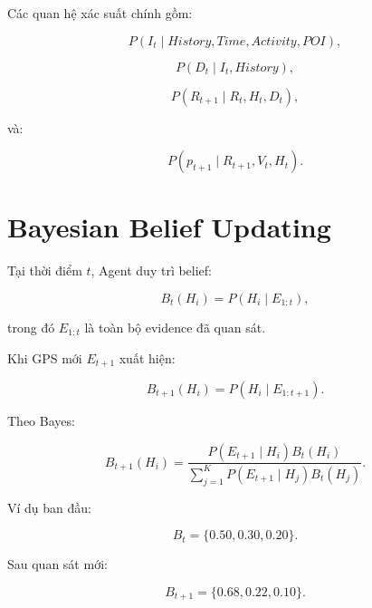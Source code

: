 \documentclass[11pt,a4paper]{article}
\begin{document}
	Các quan hệ xác suất chính gồm:
	
	\begin{equation}
		P(I_t\mid History,Time,Activity,POI),
	\end{equation}
	
	\begin{equation}
		P(D_t\mid I_t,History),
	\end{equation}
	
	\begin{equation}
		P(R_{t+1}\mid R_t,H_t,D_t),
	\end{equation}
	
	và:
	
	\begin{equation}
		P(p_{t+1}\mid R_{t+1},V_t,H_t).
	\end{equation}
	
	\section{Bayesian Belief Updating}
	
	Tại thời điểm $t$, Agent duy trì belief:
	
	\begin{equation}
		B_t(H_i)
		=
		P(H_i\mid E_{1:t}),
	\end{equation}
	
	trong đó $E_{1:t}$ là toàn bộ evidence đã quan sát.
	
	Khi GPS mới $E_{t+1}$ xuất hiện:
	
	\begin{equation}
		B_{t+1}(H_i)
		=
		P(H_i\mid E_{1:t+1}).
	\end{equation}
	
	Theo Bayes:
	
	\begin{equation}
		B_{t+1}(H_i)
		=
		\frac{
			P(E_{t+1}\mid H_i)
			B_t(H_i)
		}{
			\sum_{j=1}^{K}
			P(E_{t+1}\mid H_j)
			B_t(H_j)
		}.
	\end{equation}
	
	Ví dụ ban đầu:
	
	\begin{equation}
		B_t
		=
		\{
		0.50,
		0.30,
		0.20
		\}.
	\end{equation}
	
	Sau quan sát mới:
	
	\begin{equation}
		B_{t+1}
		=
		\{
		0.68,
		0.22,
		0.10
		\}.
	\end{equation}
	
\end{document}
